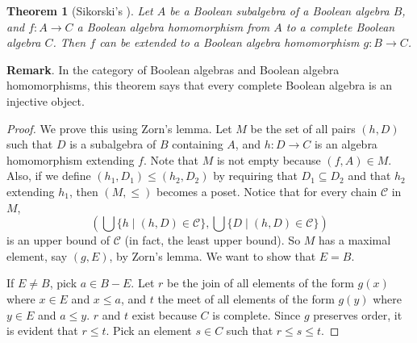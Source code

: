 \documentclass[12pt]{article}
\newtheorem{thm}{Theorem}
\begin{document}
\begin{thm}[Sikorski's ] Let $A$ be a Boolean subalgebra of a Boolean algebra $B$, and $f:A\to C$ a Boolean algebra homomorphism from $A$ to a complete Boolean algebra $C$.  Then $f$ can be extended to a Boolean algebra homomorphism $g:B \to C$. \end{thm}

\textbf{Remark}.  In the category of Boolean algebras and Boolean algebra homomorphisms, this theorem says that every complete Boolean algebra is an injective object.

\begin{proof}  We prove this using Zorn's lemma.  Let $M$ be the set of all pairs $(h,D)$ such that $D$ is a subalgebra of $B$ containing $A$, and $h:D\to C$ is an algebra homomorphism extending $f$.  Note that $M$ is not empty because $(f,A)\in M$.  Also, if we define $(h_1,D_1)\le (h_2,D_2)$ by requiring that $D_1\subseteq D_2$ and that $h_2$ extending $h_1$, then $(M,\le)$ becomes a poset.  Notice that for every chain $\mathcal{C}$ in $M$, $$(\bigcup \lbrace h\mid (h,D)\in \mathcal{C}\rbrace, \bigcup \lbrace D\mid (h,D)\in \mathcal{C}\rbrace)$$ is an upper bound of $\mathcal{C}$ (in fact, the least upper bound).  So $M$ has a maximal element, say $(g,E)$, by Zorn's lemma.  We want to show that $E=B$.

If $E\ne B$, pick $a\in B-E$.  Let $r$ be the join of all elements of the form $g(x)$ where $x\in E$ and $x\le a$, and $t$ the meet of all elements of the form $g(y)$ where $y\in E$ and $a\le y$.  $r$ and $t$ exist because $C$ is complete.  Since $g$ preserves order, it is evident that $r\le t$.  Pick an element $s\in C$ such that $r\le s\le t$.


\end{proof}
\end{document}
